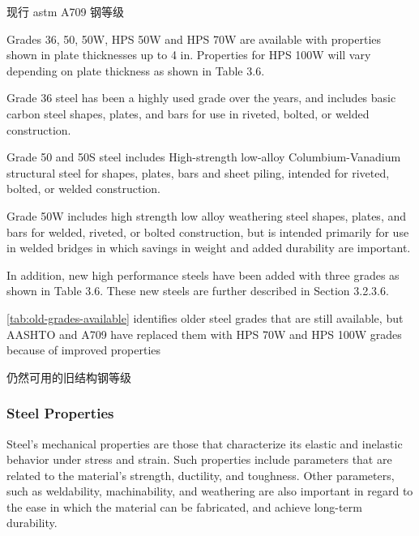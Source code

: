 \begin{table}
  \caption{现行 \acrshort*{astm} A709 钢等级}
  \label{tab:astm-steel-grades}
  
\end{table}

Grades 36, 50, 50W, HPS 50W and HPS 70W are available with properties shown in plate thicknesses up to 4 in.
Properties for HPS 100W will vary depending on plate thickness as shown in Table 3.6.

Grade 36 steel has been a highly used grade over the years, and includes basic carbon steel shapes, plates, and
bars for use in riveted, bolted, or welded construction.

Grade 50 and 50S steel includes High-strength low-alloy Columbium-Vanadium structural steel for shapes,
plates, bars and sheet piling, intended for riveted, bolted, or welded construction.

Grade 50W includes high strength low alloy weathering steel shapes, plates, and bars for welded, riveted, or
bolted construction, but is intended primarily for use in welded bridges in which savings in weight and added
durability are important.

In addition, new high performance steels have been added with three grades as shown in Table 3.6. These new steels are further described in Section 3.2.3.6.

\cref{tab:old-grades-available} identifies older steel grades that are still available, but AASHTO and A709 have replaced them with
HPS 70W and HPS 100W grades because of improved properties

\begin{table}
  \caption{仍然可用的旧结构钢等级}
  \label{tab:old-grades-available}
  
\end{table}

\subsubsection{Steel Properties}
Steel’s mechanical properties are those that characterize its elastic and inelastic behavior under stress and strain. Such properties include parameters that are related to the material’s strength, ductility, and toughness. Other parameters, such as weldability, machinability, and weathering are also important in regard to the ease in which the material can be fabricated, and achieve long-term durability.

